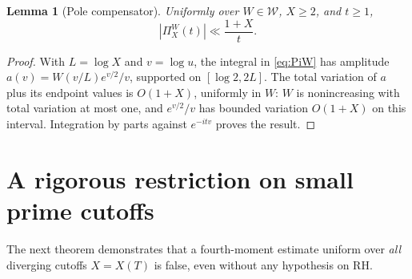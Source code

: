 \documentclass[11pt,a4paper]{article}
\numberwithin{equation}{section}
\newtheorem{lemma}[theorem]{Lemma}
\theoremstyle{definition}
\theoremstyle{remark}
\begin{document}
\begin{lemma}[Pole compensator]\label{lem:pole}
Uniformly over $W\in\mathcal W$, $X\ge2$, and $t\ge1$,
\begin{equation}\label{eq:pole-bound}
|\Pi_X^W(t)|\ll\frac{1+X}{t}.
\end{equation}
\end{lemma}
\begin{proof}
With $L=\log X$ and $v=\log u$, the integral in \eqref{eq:PiW} has amplitude $a(v)=W(v/L)e^{v/2}/v$, supported on $[\log2,2L]$. The total variation of $a$ plus its endpoint values is $O(1+X)$, uniformly in $W$: $W$ is nonincreasing with total variation at most one, and $e^{v/2}/v$ has bounded variation $O(1+X)$ on this interval. Integration by parts against $e^{-itv}$ proves the result.
\end{proof}

\section{A rigorous restriction on small prime cutoffs}\label{sec:subpoly}
The next theorem demonstrates that a fourth-moment estimate uniform over \emph{all} diverging cutoffs $X=X(T)$ is false, even without any hypothesis on RH.
\end{document}
